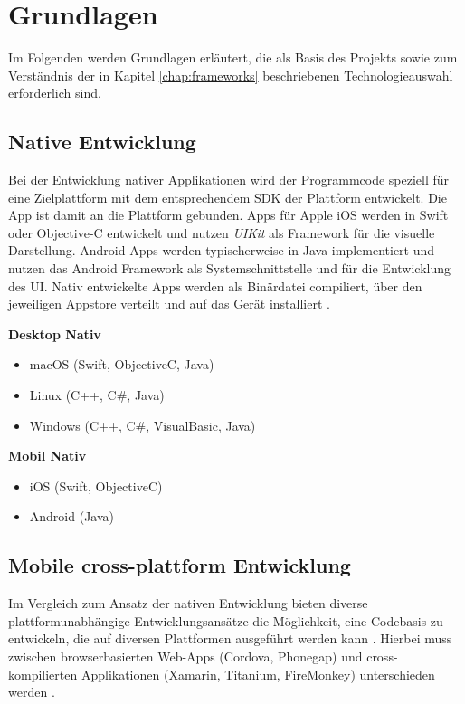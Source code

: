 
\chapter{Grundlagen}

Im Folgenden werden Grundlagen erläutert, die als Basis des Projekts sowie zum Verständnis der in Kapitel \ref{chap:frameworks} beschriebenen Technologieauswahl erforderlich sind.


\section{Native Entwicklung}

Bei der Entwicklung nativer Applikationen wird der Programmcode speziell für eine Zielplattform mit dem entsprechendem \ac{SDK} der Plattform entwickelt.
Die App ist damit an die Plattform gebunden. Apps für Apple iOS werden in Swift oder Objective-C entwickelt und nutzen \emph{UIKit} als Framework für die visuelle Darstellung.
Android Apps werden typischerweise in Java implementiert und nutzen das Android Framework als Systemschnittstelle und für die Entwicklung des \ac{UI}.
Nativ entwickelte Apps werden als Binärdatei compiliert, über den jeweiligen Appstore verteilt und auf das Gerät installiert \cite{Heitkoetter2013}.

\vspace{0.3cm}
\textbf{Desktop Nativ}
\begin{itemize}
\item macOS (Swift, ObjectiveC, Java)
\item Linux (C++, C\#, Java)
\item Windows (C++, C\#, VisualBasic, Java)
\end{itemize}
\vspace{0.3cm}

\textbf{Mobil Nativ}
\begin{itemize}
\item iOS (Swift, ObjectiveC)
\item Android (Java)
\end{itemize}
\vspace{0.3cm}

\section{Mobile cross-plattform Entwicklung}

Im Vergleich zum Ansatz der nativen Entwicklung bieten diverse plattformunabhängige Entwicklungsansätze die Möglichkeit, eine Codebasis zu entwickeln,
die auf diversen Plattformen ausgeführt werden kann \cite{Heitkoetter2013}.
Hierbei muss zwischen browserbasierten Web-Apps (Cordova, Phonegap) und cross-kompilierten Applikationen (Xamarin, Titanium, FireMonkey) unterschieden werden
\cite{Xamar84:online}.

